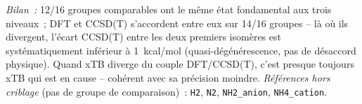 \noindent\textit{Bilan~:} 12/16 groupes comparables ont le m\^eme \'etat fondamental aux trois niveaux~; DFT et CCSD(T) s'accordent entre eux sur 14/16 groupes -- l\`a o\`u ils divergent, l'\'ecart CCSD(T) entre les deux premiers isom\`eres est syst\'ematiquement inf\'erieur \`a 1~kcal/mol (quasi-d\'eg\'en\'erescence, pas de d\'esaccord physique). Quand xTB diverge du couple DFT/CCSD(T), c'est presque toujours xTB qui est en cause -- coh\'erent avec sa pr\'ecision moindre.
\bigskip\noindent\textit{R\'ef\'erences hors criblage} (pas de groupe de comparaison)~: \texttt{H2}, \texttt{N2}, \texttt{NH2\_anion}, \texttt{NH4\_cation}.